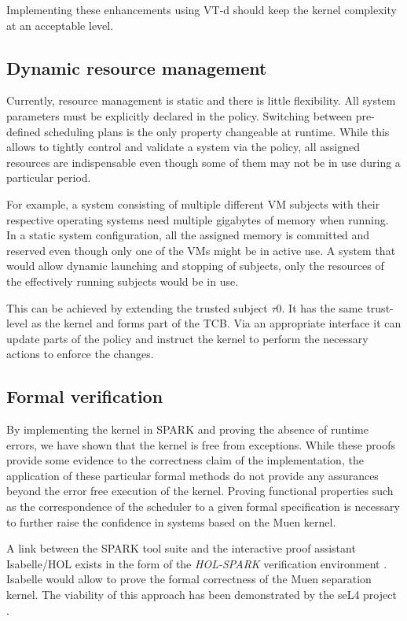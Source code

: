 Implementing these enhancements using VT-d should keep the kernel complexity at
an acceptable level.

\subsection{Dynamic resource management}
Currently, resource management is static and there is little flexibility. All
system parameters must be explicitly declared in the policy. Switching between
pre-defined scheduling plans is the only property changeable at runtime. While
this allows to tightly control and validate a system via the policy, all
assigned resources are indispensable even though some of them may not be in use
during a particular period.

For example, a system consisting of multiple different VM subjects with their
respective operating systems need multiple gigabytes of memory when running.
In a static system configuration, all the assigned memory is committed and
reserved even though only one of the VMs might be in active use. A system that
would allow dynamic launching and stopping of subjects, only the resources of
the effectively running subjects would be in use.

This can be achieved by extending the trusted subject $\tau$0. It has the same
trust-level as the kernel and forms part of the TCB. Via an appropriate
interface it can update parts of the policy and instruct the kernel to perform
the necessary actions to enforce the changes.

\subsection{Formal verification}
By implementing the kernel in SPARK and proving the absence of runtime errors,
we have shown that the kernel is free from exceptions. While these proofs
provide some evidence to the correctness claim of the implementation, the
application of these particular formal methods do not provide any assurances
beyond the error free execution of the kernel. Proving functional properties
such as the correspondence of the scheduler to a given formal specification is
necessary to further raise the confidence in systems based on the Muen kernel.

A link between the SPARK tool suite and the interactive proof assistant
Isabelle/HOL exists in the form of the \emph{HOL-SPARK} verification
environment \cite{berghofer:OASIcs:2012:3587}. Isabelle would allow to prove
the formal correctness of the Muen separation kernel. The viability of this
approach has been demonstrated by the seL4 project \cite{Klein_EHACDEEKNSTW_09}.
